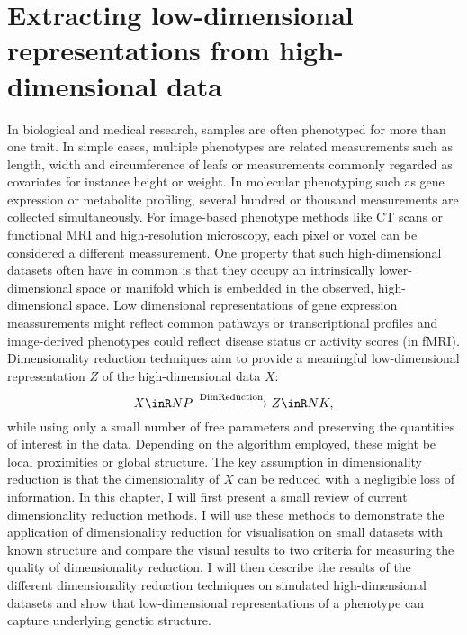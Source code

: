 \chapter{Extracting low-dimensional representations from high-dimensional data}
\label{chapter:DimReduction}
In biological and medical research, samples are often phenotyped for more than one trait. In simple cases, multiple phenotypes are related measurements such as length, width and circumference of leafs or measurements commonly regarded as covariates for instance height or weight. In molecular phenotyping such as gene expression or metabolite profiling, several hundred or thousand measurements are collected simultaneously.  For image-based phenotype methods like CT scans or functional MRI and high-resolution microscopy, each pixel or voxel can be considered a different meassurement. One property that such high-dimensional datasets often have in common is that they occupy an intrinsically lower-dimensional space or manifold which is embedded in the observed, high-dimensional space. Low dimensional representations of gene expression meassurements might reflect common pathways or transcriptional profiles and image-derived phenotypes could reflect disease status or activity scores (in fMRI).  Dimensionality reduction techniques aim to provide a meaningful low-dimensional representation \(Z\) of the high-dimensional data \(X\):
\begin{equation}
X \inR N P \xrightarrow{\text{DimReduction}} Z \inR N K,
\end{equation}
while using only a small number of free parameters and preserving the quantities of interest in the data. Depending on the algorithm employed, these might be local proximities or global structure. The key assumption in dimensionality reduction is that the dimensionality of \(X\) can be reduced with a negligible loss of information. 
In this chapter, I will first present a small review of current dimensionality reduction methods. I will use these methods to demonstrate the application of dimensionality reduction for visualisation on small datasets with known structure and compare the visual results to two criteria for measuring the quality of dimensionality reduction. I will then describe the results of the different dimensionality reduction techniques on simulated high-dimensional datasets and show that low-dimensional representations of a phenotype can capture underlying genetic structure. 

